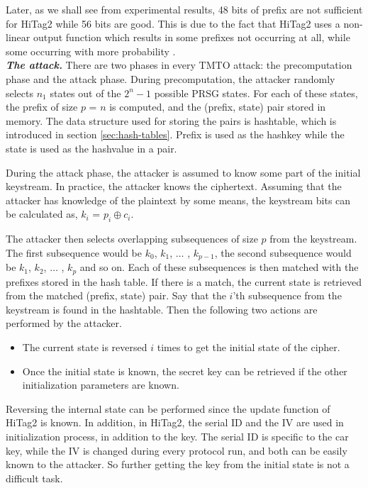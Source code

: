 Later, as we shall see from experimental results, 48 bits of prefix are not sufficient for HiTag2 while 56 bits are good. This is due to the fact that HiTag2 uses a non-linear output function which results in some prefixes not occurring at all, while some occurring with more probability \cite{erik-discussions}\cite{email-karsten}.\\

\noindent \textit{\textbf{The attack.}} There are two phases in every TMTO attack: the precomputation phase and the attack phase. During precomputation, the attacker randomly selects $n_1$ states out of the $2^n - 1$ possible PRSG states. For each of these states, the prefix of size $p$ = $n$ is computed, and the (prefix, state) pair stored in memory. The data structure used for storing the pairs is hashtable, which is introduced in section \ref{sec:hash-tables}. Prefix is used as the hashkey while the state is used as the hashvalue in a pair.

During the attack phase, the attacker is assumed to know some part of the initial keystream. In practice, the attacker knows the ciphertext. Assuming that the attacker has knowledge of the plaintext by some means, the keystream bits can be calculated as, $k_i$ = $p_i \oplus c_i$. 

The attacker then selects overlapping subsequences of size $p$ from the keystream. The first subsequence would be $k_0$, $k_1$, $\ldots$ , $k_{p-1}$, the second subsequence would be $k_1$, $k_2$, $\ldots$ , $k_{p}$ and so on. Each of these subsequences is then matched with the prefixes stored in the hash table. If there is a match, the current state is retrieved from the matched (prefix, state) pair. Say that the $i$'th subsequence from the keystream is found in the hashtable. Then the following two actions are performed by the attacker.
\begin{itemize}
\item The current state is reversed $i$ times to get the initial state of the cipher. 
\item Once the initial state is known, the secret key can be retrieved if the other initialization parameters are known.
\end{itemize} 
Reversing the internal state can be performed since the update function of HiTag2 is known. In addition, in HiTag2, the serial ID and the IV are used in initialization process, in addition to the key. The serial ID is specific to the car key, while the IV is changed during every protocol run, and both can be easily known to the attacker. So further getting the key from the initial state is not a difficult task. 


